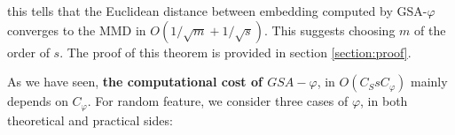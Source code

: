 this tells that the Euclidean distance between embedding computed by GSA-$\varphi$ converges to the MMD in $O(1/\sqrt{m} + 1/\sqrt{s})$. This suggests choosing $m$ of the order of $s$. The proof of this theorem is provided in section \ref{section:proof}.

As we have seen, \textbf{the computational cost of $GSA-\varphi$}, in $O(C_S s C_\varphi)$ mainly depends on $C_\varphi$. For random feature, we consider three cases of $\varphi$, in both theoretical and practical sides:

